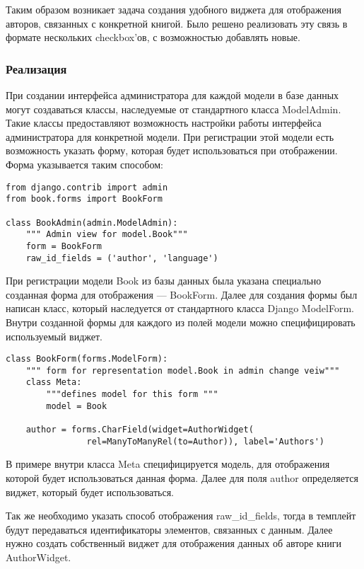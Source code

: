 \documentclass[a4paper]{report}
\begin{document}
Таким образом возникает задача создания удобного виджета для отображения авторов, связанных с конкретной книгой.
Было решено реализовать эту связь в формате нескольких checkbox'ов, с возможностью добавлять
новые.

\subsubsection{Реализация}

При создании интерфейса администратора для каждой модели в базе данных могут создаваться классы, наследуемые от стандартного класса ModelAdmin. Такие классы предоставляют возможность настройки работы интерфейса администратора для конкретной модели. При регистрации этой модели есть возможность указать форму, которая будет использоваться при отображении. Форма указывается таким способом:

{
\small \begin{verbatim}
from django.contrib import admin
from book.forms import BookForm

class BookAdmin(admin.ModelAdmin):
    """ Admin view for model.Book"""
    form = BookForm
    raw_id_fields = ('author', 'language')
\end{verbatim}
}

При регистрации модели Book из базы данных была указана специально созданная форма для отображения --- BookForm. Далее для создания формы был написан класс, который наследуется от стандартного класса Django ModelForm. Внутри созданной формы для каждого из полей модели можно специфицировать используемый виджет.

{
\small \begin{verbatim}
class BookForm(forms.ModelForm):
    """ form for representation model.Book in admin change veiw"""
    class Meta:
        """defines model for this form """
        model = Book

    author = forms.CharField(widget=AuthorWidget(
                rel=ManyToManyRel(to=Author)), label='Authors')
\end{verbatim}
}

В примере внутри класса Meta специфицируется модель, для отображения которой будет использоваться данная форма. Далее для поля author определяется виджет, который будет использоваться. 

Так же необходимо указать способ отображения raw\_id\_fields, тогда в темплейт будут передаваться идентификаторы элементов, связанных с данным. Далее нужно создать собственный виджет для отображения данных об авторе книги AuthorWidget. 
\end{document}
